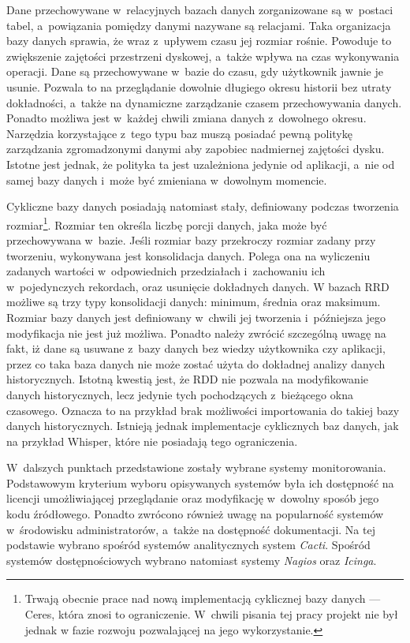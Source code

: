 Dane przechowywane w~relacyjnych bazach danych zorganizowane są
w~postaci tabel, a~powiązania pomiędzy danymi nazywane są
relacjami. Taka organizacja bazy danych sprawia, że wraz z~upływem
czasu jej rozmiar rośnie. Powoduje to zwiększenie zajętości
przestrzeni dyskowej, a~także wpływa na czas wykonywania
operacji. Dane są przechowywane w~bazie do czasu, gdy użytkownik
jawnie je usunie. Pozwala to na przeglądanie dowolnie długiego okresu
historii bez utraty dokładności, a~także na dynamiczne zarządzanie
czasem przechowywania danych. Ponadto możliwa jest w~każdej chwili
zmiana danych z~dowolnego okresu. Narzędzia korzystające z~tego typu
baz muszą posiadać pewną politykę zarządzania zgromadzonymi danymi aby
zapobiec nadmiernej zajętości dysku. Istotne jest jednak, że polityka
ta jest uzależniona jedynie od aplikacji, a~nie od samej bazy danych
i~może być zmieniana w~dowolnym momencie.

Cykliczne bazy danych posiadają natomiast stały, definiowany podczas
tworzenia rozmiar\footnote{Trwają obecnie prace nad nową implementacją
  cyklicznej bazy danych --- Ceres\cite{www:Ceres}, która znosi to
  ograniczenie. W~chwili pisania tej pracy projekt nie był jednak w
  fazie rozwoju pozwalającej na jego wykorzystanie.}. Rozmiar ten
określa liczbę porcji danych, jaka może być przechowywana
w~bazie. Jeśli rozmiar bazy przekroczy rozmiar zadany przy tworzeniu,
wykonywana jest konsolidacja danych. Polega ona na wyliczeniu zadanych
wartości w~odpowiednich przedziałach i~zachowaniu ich w~pojedynczych
rekordach, oraz usunięcie dokładnych danych. W bazach RRD możliwe są
trzy typy konsolidacji danych: minimum, średnia oraz maksimum. Rozmiar
bazy danych jest definiowany w~chwili jej tworzenia i~późniejsza jego
modyfikacja nie jest już możliwa. Ponadto należy zwrócić szczególną
uwagę na fakt, iż dane są usuwane z~bazy danych bez wiedzy użytkownika
czy aplikacji, przez co taka baza danych nie może zostać użyta do
dokładnej analizy danych historycznych. Istotną kwestią jest, że RDD
nie pozwala na modyfikowanie danych historycznych, lecz jedynie tych
pochodzących z~bieżącego okna czasowego. Oznacza to na przykład brak
możliwości importowania do takiej bazy danych historycznych. Istnieją
jednak implementacje cyklicznych baz danych, jak na przykład Whisper,
które nie posiadają tego ograniczenia.

W~dalszych punktach przedstawione zostały wybrane systemy
monitorowania. Podstawowym kryterium wyboru opisywanych systemów była
ich dostępność na licencji umożliwiającej przeglądanie oraz
modyfikację w~dowolny sposób jego kodu źródłowego. Ponadto zwrócono
również uwagę na popularność systemów w~środowisku administratorów,
a~także na dostępność dokumentacji. Na tej podstawie wybrano spośród
systemów analitycznych system {\em Cacti}. Spośród systemów dostępnościowych
wybrano natomiast systemy {\em Nagios} oraz {\em Icinga}.


